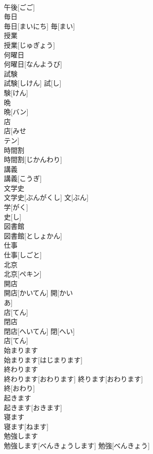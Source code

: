 \documentclass[8pt]{extreport}
\begin{document}
\begin{CJK}{UTF8}{min}
\\	午後[ごご]	
\\	毎日	
\\	毎日[まいにち]	毎[まい] 
\\	授業	
\\	授業[じゅぎょう]	
\\	何曜日	
\\	何曜日[なんようび]	
\\	試験	
\\	試験[しけん]	試[し] 
\\	験[けん] 
\\	晩	
\\	晩[バン]	
\\	店	
\\	店[みせ 
\\	テン]	
\\	時間割	
\\	時間割[じかんわり]	
\\	講義	
\\	講義[こうぎ]	
\\	文学史	
\\	文学史[ぶんがくし]	文[ぶん] 
\\	学[がく] 
\\	史[し] 
\\	図書館	
\\	図書館[としょかん]	
\\	仕事	
\\	仕事[しごと]	
\\	北京	
\\	北京[ペキン]	
\\	開店	
\\	開店[かいてん]	開[かい 
\\	あ] 
\\	店[てん] 
\\	閉店	
\\	閉店[へいてん]	閉[へい] 
\\	店[てん] 
\\	始まります	
\\	始まります[はじまります]	
\\	終わります	
\\	終わります[おわります]	終ります[おわります] 
\\	終[おわり] 
\\	起きます	
\\	起きます[おきます]	
\\	寝ます	
\\	寝ます[ねます]	
\\	勉強します	
\\	勉強します[べんきょうします]	勉強[べんきょう] 

\end{CJK}
\end{document}
